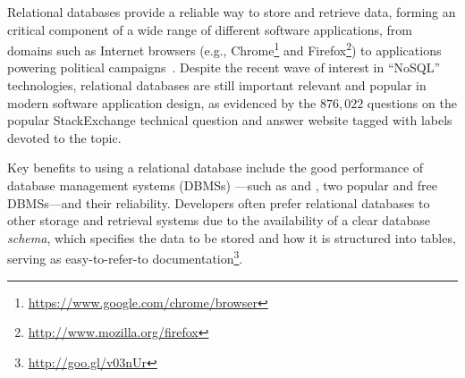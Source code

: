 %
%
%
%

\begin{sloppypar}
Relational databases provide a reliable way to store and retrieve data, forming an critical component of a wide range of different software applications, from domains such as Internet browsers (e.g., Chrome\footnote{\url{https://www.google.com/chrome/browser}} and Firefox\footnote{\url{http://www.mozilla.org/firefox}}) to applications powering political campaigns~\cite{Butler2012}. Despite the recent wave of interest in ``NoSQL'' technologies, relational databases are still important relevant and popular in modern software application design, as evidenced by the $876,022$ questions on the popular StackExchange technical question and answer website tagged with labels devoted to the topic.
\end{sloppypar}

Key benefits to using a relational database include the good performance of database management systems (DBMSs) \cite{Abrahami2015}---such as \Postgres and \SQLite, two popular and free DBMSs---and their reliability. Developers often prefer relational databases to other storage and retrieval systems due to the availability of a clear database {\it schema}, which specifies the data to be stored and how it is structured into tables, serving as easy-to-refer-to documentation\footnote{\url{http://goo.gl/v03nUr}}\hspace{-1ex}. %
 
